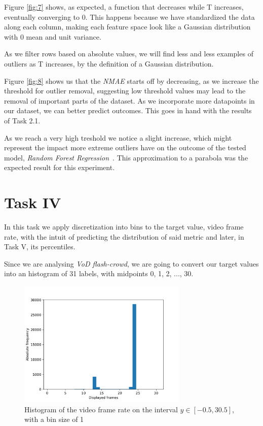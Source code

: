 \documentclass[10pt]{article}
\begin{document}
Figure \ref{fig:7} shows, as expected, a function that decreases while T increases, eventually converging to 0. This happens because we have standardized the data along each column, making each feature space look like a Gaussian distribution with 0 mean and unit variance.

As we filter rows based on absolute values, we will find less and less examples of outliers as T increases, by the definition of a Gaussian distribution.

Figure \ref{fig:8} shows us that the \textit{NMAE} starts off by decreasing, as we increase the threshold for outlier removal, suggesting low threshold values may lead to the removal of important parts of the dataset. As we incorporate more datapoints in our dataset, we can better predict outcomes. This goes in hand with the results of Task 2.1.

As we reach a very high treshold we notice a slight increase, which might represent the impact more extreme outliers have on the outcome of the tested model, \textit{Random Forest Regression}~\cite{RFR}. This approximation to a parabola was the expected result for this experiment.

\section*{Task IV}
\label{sec:8}

In this task we apply discretization into bins to the target value, video frame rate, with the intuit of predicting the distribution of said metric and later, in Task V, its percentiles.

Since we are analysing \textit{VoD flash-crowd}, we are going to convert our target values into an histogram of 31 labels, with midpoints 0, 1, 2, ..., 30.

\begin{figure}[h!]
    \centering
    \captionsetup{justification=centering}
    \includegraphics[width=0.72\textwidth,height=\textheight,keepaspectratio]{../result/project1/discretized_frames_hist.pdf}
    \caption{Histogram of the video frame rate on the interval $y\in[-0.5,30.5]$, with a bin size of 1}
    \label{fig:9}
\end{figure}
\end{document}
